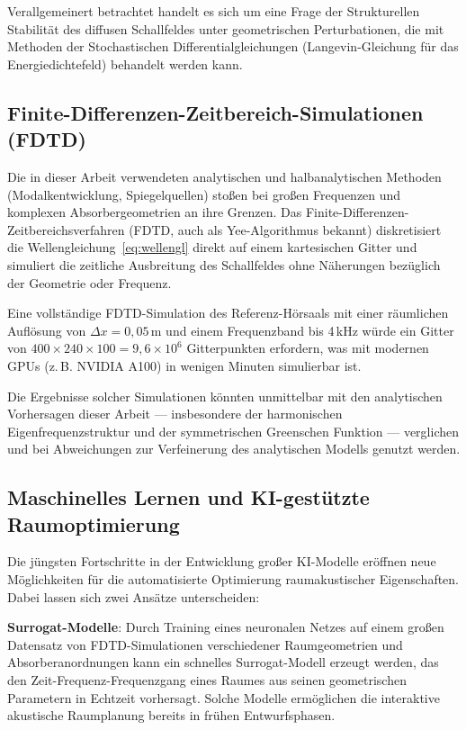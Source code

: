 ﻿\documentclass[12pt, a4paper]{article}
\theoremstyle{definition}
\theoremstyle{remark}
\begin{document}
Verallgemeinert betrachtet handelt es sich um eine Frage der
Strukturellen Stabilität des diffusen Schallfeldes unter geometrischen
Perturbationen, die mit Methoden der Stochastischen Differentialgleichungen
(Langevin-Gleichung für das Energiedichtefeld) behandelt werden kann.

\subsection{Finite-Differenzen-Zeitbereich-Simulationen (FDTD)}

Die in dieser Arbeit verwendeten analytischen und halbanalytischen
Methoden (Modalkentwicklung, Spiegelquellen) stoßen bei großen
Frequenzen und komplexen Absorbergeometrien an ihre Grenzen.
Das Finite-Differenzen-Zeitbereichsverfahren (FDTD, auch als
Yee-Algorithmus bekannt) diskretisiert die Wellengleichung~\eqref{eq:wellengl}
direkt auf einem kartesischen Gitter und simuliert die zeitliche Ausbreitung
des Schallfeldes ohne Näherungen bezüglich der Geometrie oder Frequenz.

Eine vollständige FDTD-Simulation des Referenz-Hörsaals mit einer räumlichen
Auflösung von $\Delta x = 0{,}05\,\mathrm{m}$ und einem Frequenzband bis
4\,kHz würde ein Gitter von $400 \times 240 \times 100 = 9{,}6 \times 10^6$
Gitterpunkten erfordern, was mit modernen GPUs (z.\,B. NVIDIA A100)
in wenigen Minuten simulierbar ist.

Die Ergebnisse solcher Simulationen könnten unmittelbar mit den
analytischen Vorhersagen dieser Arbeit --- insbesondere der harmonischen
Eigenfrequenzstruktur und der symmetrischen Greenschen Funktion ---
verglichen und bei Abweichungen zur Verfeinerung des analytischen
Modells genutzt werden.

\subsection{Maschinelles Lernen und KI-gestützte Raumoptimierung}

Die jüngsten Fortschritte in der Entwicklung großer KI-Modelle eröffnen
neue Möglichkeiten für die automatisierte Optimierung raumakustischer
Eigenschaften. Dabei lassen sich zwei Ansätze unterscheiden:

\textbf{Surrogat-Modelle}: Durch Training eines neuronalen Netzes auf
einem großen Datensatz von FDTD-Simulationen verschiedener Raumgeometrien
und Absorberanordnungen kann ein schnelles Surrogat-Modell erzeugt werden,
das den Zeit-Frequenz-Frequenzgang eines Raumes aus seinen geometrischen
Parametern in Echtzeit vorhersagt. Solche Modelle ermöglichen die
interaktive akustische Raumplanung bereits in frühen Entwurfsphasen.
\end{document}
